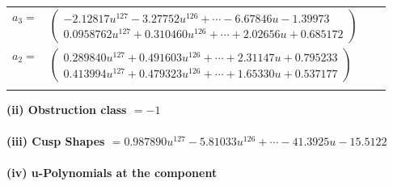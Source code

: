 \documentclass[1p]{elsarticle_modified}
\theoremstyle{definition}
\begin{document}
\begin{tabular}{m{7pt} m{180pt} m{7pt} m{180pt} }
\flushright $a_{3}=$&$\begin{pmatrix}-2.12817 u^{127}-3.27752 u^{126}+\cdots-6.67846 u-1.39973\\0.0958762 u^{127}+0.310460 u^{126}+\cdots+2.02656 u+0.685172\end{pmatrix}$ \\
\flushright $a_{2}=$&$\begin{pmatrix}0.289840 u^{127}+0.491603 u^{126}+\cdots+2.31147 u+0.795233\\0.413994 u^{127}+0.479323 u^{126}+\cdots+1.65330 u+0.537177\end{pmatrix}$\\&\end{tabular}
\flushleft \textbf{(ii) Obstruction class $= -1$}\\~\\
\flushleft \textbf{(iii) Cusp Shapes $= 0.987890 u^{127}-5.81033 u^{126}+\cdots-41.3925 u-15.5122$}\\~\\
\newpage\renewcommand{\arraystretch}{1}
\flushleft \textbf{(iv) u-Polynomials at the component}\newline \\
\end{document}
